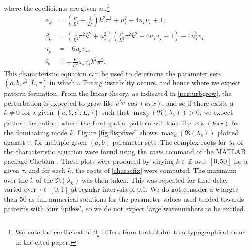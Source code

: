 where the coefficients are given as,\footnote{We note the coefficient of $\beta_k$ differs from that of \cite{yigaffneyli} due to a typographical error in the cited paper.}
\begin{equation}\label{fixcoeffs}
    \begin{split}
\alpha_k&=\left(\frac{\epsilon^2}{L^2}+\frac{1}{L^2}\right)k^2\pi^2+u_\star^2+4u_\star v_\star+1,\\
\beta_k&=\left(\frac{1}{L^2}\pi^2k^2+u_\star^2\right)\left(\frac{\epsilon^2}{L^2}\pi^2k^2+4u_\star v_\star+1\right)-4u_\star^3v_\star,\\
\gamma_k&=-6u_\star v_\star,\\
\delta_k&=-\frac{6}{L^2}u_\star v_\star k^2\pi^2.
\end{split}
\end{equation}
This characteristic equation can be used to determine the parameter sets $(a,b,\epsilon^2,L,\tau)$ in which a Turing instability occurs, and hence where we expect pattern formation. From the linear theory, as indicated in \eqref{perturbgrow}, the perturbation is expected to grow like $e^{\lambda_k t}\cos(k\pi x)$, and so if there exists a $k\neq0$ for a given $(a,b,\epsilon^2,L,\tau)$ such that $\max_k(\Re(\lambda_k))>0$, we expect pattern formation, where the final spatial pattern will look like $\cos(k\pi x)$ for the dominating mode $k$. Figure \ref{fig:dispfixed} shows $\max_k(\Re(\lambda_k))$ plotted against $\tau$, for multiple given $(a,b)$ parameter sets. The complex roots for $\lambda_k$ of the characteristic equation were found using the \emph{roots} command of the MATLAB package Chebfun \cite{chebfun}. These plots were produced by varying $k\in\mathbb{Z}$ over $[0,50]$ for a given $\tau$, and for each $k$, the roots of \eqref{characfix} were computed. The maximum over the $k$ of the $\Re(\lambda_k)$ was then taken. This was repeated for time delay varied over $\tau\in[0,1]$ at regular intervals of $0.1$. We do not consider a $k$ larger than $50$ as full numerical solutions for the parameter values used tended towards patterns with four `spikes', so we do not expect large wavenumbers to be excited.

